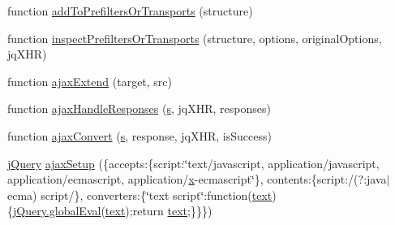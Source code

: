 \begin{DoxyCompactItemize}
function \hyperlink{packages_2j_query_81_810_82_2_content_2_scripts_2jquery-1_810_82_8js_ae8bffbac8c6b2208e0ca37b475ec0b70}{add\+To\+Prefilters\+Or\+Transports} (structure)
\item 
function \hyperlink{packages_2j_query_81_810_82_2_content_2_scripts_2jquery-1_810_82_8js_ac96b244aea80657fe2d6e3d2c1e8b622}{inspect\+Prefilters\+Or\+Transports} (structure, options, original\+Options, jq\+X\+H\+R)
\item 
function \hyperlink{packages_2j_query_81_810_82_2_content_2_scripts_2jquery-1_810_82_8js_a113ade43cfd5328ebd5ccc84f45fe4de}{ajax\+Extend} (target, src)
\item 
function \hyperlink{packages_2j_query_81_810_82_2_content_2_scripts_2jquery-1_810_82_8js_a71c2db7846f21963cee426cb81003c63}{ajax\+Handle\+Responses} (\hyperlink{packages_2_respond_81_82_80_2content_2_scripts_2respond_8min_8js_ad9a7d92cb87932d25187fdec3ba1b621}{s}, jq\+X\+H\+R, responses)
\item 
function \hyperlink{packages_2j_query_81_810_82_2_content_2_scripts_2jquery-1_810_82_8js_a549518271b8708165811ae69c274b58a}{ajax\+Convert} (\hyperlink{packages_2_respond_81_82_80_2content_2_scripts_2respond_8min_8js_ad9a7d92cb87932d25187fdec3ba1b621}{s}, response, jq\+X\+H\+R, is\+Success)
\item 
\hyperlink{packages_2j_query_81_810_82_2_content_2_scripts_2jquery-1_810_82_8js_a5e01048fbd3a30b44e8d491d8945c457}{j\+Query} \hyperlink{packages_2j_query_81_810_82_2_content_2_scripts_2jquery-1_810_82_8js_a52a40924d02e0d9756f051e36a640cd6}{ajax\+Setup} (\{accepts\+:\{script\+:\char`\"{}text/javascript, application/javascript, application/ecmascript, application/\hyperlink{packages_2j_query_81_810_82_2_content_2_scripts_2jquery-1_810_82_8min_8js_a5ce50d751c9664d05375c8f5080ed43e}{x}-\/ecmascript\char`\"{}\}, contents\+:\{script\+:/(?\+:java$\vert$ecma) script/\}, converters\+:\{\char`\"{}text script\char`\"{}\+:function(\hyperlink{jquery-1_810_82-vsdoc_8js_aa5b77da29631a344064bb3d20c8702de}{text})\{\hyperlink{jquery-1_810_82-vsdoc_8js_a898e1e411825feebc0c78978f2a2a140}{j\+Query.\+global\+Eval}(\hyperlink{jquery-1_810_82-vsdoc_8js_aa5b77da29631a344064bb3d20c8702de}{text});return \hyperlink{jquery-1_810_82-vsdoc_8js_aa5b77da29631a344064bb3d20c8702de}{text};\}\}\})
\item 

\end{DoxyCompactItemize}
